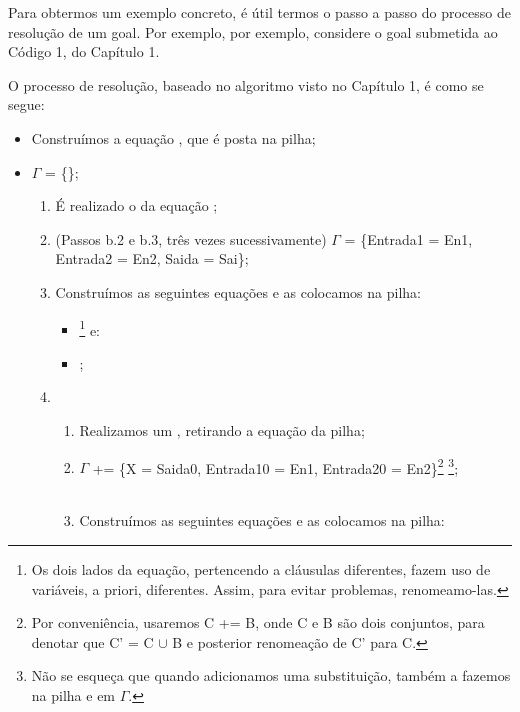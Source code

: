 \documentclass{article}
\begin{document}
Para obtermos um exemplo concreto, é útil termos o passo a passo do processo de resolução de um goal. Por exemplo, por exemplo, considere o goal  submetida ao Código 1, do Capítulo 1.

O processo de resolução, baseado no algoritmo visto no Capítulo 1, é como se segue:

\begin{itemize}
  \item Construímos a equação , que é posta na pilha;
  \item $\Gamma$ = \{\};
    \begin{enumerate}
      \item É realizado o  da equação ;
      \item (Passos b.2 e b.3, três vezes sucessivamente) $\Gamma$ = \{Entrada1 = En1, Entrada2 = En2, Saida = Sai\}; %
      \item Construímos as seguintes equações e as colocamos na pilha:
        \begin{itemize}
          \item {}\footnote{Os dois lados da equação, pertencendo a cláusulas diferentes, fazem uso de variáveis, a priori, diferentes. Assim, para evitar problemas, renomeamo-las.} e:
          \item {};
        \end{itemize}
      \item
        \begin{enumerate}
          \item Realizamos um , retirando a equação  da pilha;
          \item $\Gamma$ += \{X = Saida0, Entrada10 = En1, Entrada20 = En2\}\footnote{Por conveniência, usaremos C += B, onde C e B são dois conjuntos, para denotar que C' = C $\cup$ B e posterior renomeação de C' para C.} \footnote{Não se esqueça que quando adicionamos uma substituição, também a fazemos na pilha e em $\Gamma$.};
          \item Construímos as seguintes equações e as colocamos na pilha:
            \begin{itemize}

\end{itemize}
\end{enumerate}
\end{enumerate}
\end{itemize}
\end{document}

